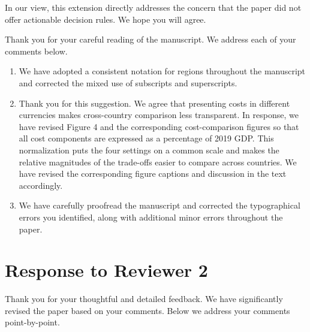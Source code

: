 \documentclass[letterpaper,twoside,11pt]{reviewresponse}
\begin{document}
In our view, this extension directly addresses the concern that the paper did not offer actionable decision rules. We hope you will agree.


Thank you for your careful reading of the manuscript. We address each of your comments below.
\begin{enumerate}
\item We have adopted a consistent notation for regions throughout the manuscript and corrected the mixed use of subscripts and superscripts.
\item Thank you for this suggestion. We agree that presenting costs in different currencies makes cross-country comparison less transparent. In response, we have revised Figure 4 and the corresponding cost-comparison figures so that all cost components are expressed as a percentage of 2019 GDP. This normalization puts the four settings on a common scale and makes the relative magnitudes of the trade-offs easier to compare across countries. We have revised the corresponding figure captions and discussion in the text accordingly.
\item We have carefully proofread the manuscript and corrected the typographical errors you identified, along with additional minor errors throughout the paper.
\end{enumerate}


\newpage
\section*{Response to Reviewer 2}
Thank you for your thoughtful and detailed feedback. We have significantly revised the paper based on your comments. Below we address your comments point-by-point.

\end{document}
